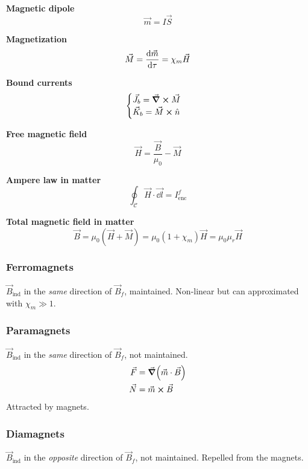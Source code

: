 \documentclass[10pt]{extarticle}
\numberwithin{equation}{section}
\begin{document}
\begin{multicols}{2}
    \textbf{Magnetic dipole}
    \begin{equation}
        \vec m = I \vec S
    \end{equation}

    \textbf{Magnetization}
    \begin{equation}
        \vec M = \dv{\vec m}{\tau} = \chi_m \vec H
    \end{equation}

    \textbf{Bound currents}
    \begin{equation}
        \begin{cases}
            \vec J_b = \curl \vec M \\
            \vec K_b = \vec M \cross \hat n
        \end{cases}
    \end{equation}

    \textbf{Free magnetic field}
    \begin{equation}
        \vec H = \frac{\vec B}{\mu_0} - \vec M
    \end{equation}

    \textbf{Ampere law in matter}
    \begin{equation}
        \oint_\mathcal{C} \vec H \cdot \vec{\dd l } = I^f_{\text{enc}}
    \end{equation}

    \textbf{Total magnetic field in matter}
    \begin{equation}
        \vec B = \mu_0(\vec H + \vec M) = \mu_0 (1 + \chi_m) \vec H = \mu_0 \mu_r \vec H
    \end{equation}

    \subsubsection{Ferromagnets}
    $\vec B_\text{ind}$ in the \emph{same} direction of $\vec B_f$, maintained.
    Non-linear but can approximated with $\chi_m \gg 1$.

    \subsubsection{Paramagnets}
    $\vec B_\text{ind}$ in the \emph{same} direction of $\vec B_f$, not maintained.
    \begin{align}
        \vec F & = \grad(\vec m \cdot \vec B) \\
        \vec N & = \vec m \cross \vec B
    \end{align}
    Attracted by magnets.

    \subsubsection{Diamagnets}
    $\vec B_\text{ind}$ in the \emph{opposite} direction of $\vec B_f$, not maintained.
    Repelled from the magnets.
\end{multicols}
\end{document}
